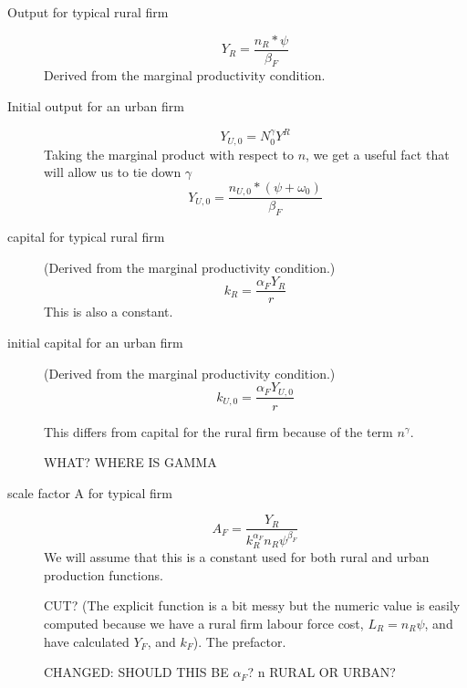 \begin{description}


\item[Output for typical rural firm]  
\begin{equation}Y_R=\frac{n_R*\psi}{\beta_F}\label{eqn_Rural_output}\end{equation}
Derived from the marginal productivity condition.


\item[Initial output for an urban firm] 
\[Y_{U, 0} = N_0^\gamma Y^R\]  
Taking the marginal product with respect to $n$, we get a useful fact that will allow us to tie down $\gamma$
\[Y_{U,0} = \frac{n_{U,0}*(\psi+\omega_0)}{\beta_F}\]

\item[capital for typical rural firm] (Derived from the marginal productivity condition.)
\[k_R=  \frac{\alpha_F Y_R }{r}\]
This is also a constant.
 
\item[initial capital for an urban firm] (Derived from the marginal productivity condition.)
\[k_{U,0}=  \frac{\alpha_F Y_{U,0} }{r}\]


This differs from capital  for the rural firm because of the term $n^\gamma$. 

WHAT? WHERE IS GAMMA


\item[scale factor A for typical  firm] 
\[A_F= \frac{Y_R}{k_R^{\alpha_F} {n_R\psi}^{\beta_F}}\]
We will assume that this is a constant used for both rural and urban production functions. 

CUT? (The explicit function is a bit  messy but the numeric value is easily computed because we have a rural firm labour force cost, $L_R=n_R\psi$, and have calculated $Y_F$, and  $k_F$). The prefactor.

CHANGED: SHOULD THIS BE $\alpha_F$? n RURAL OR URBAN?

\end{description}
